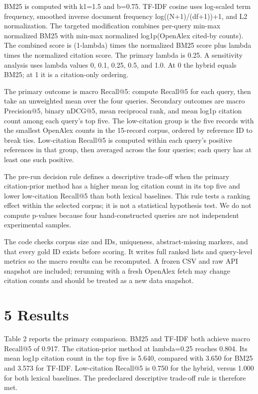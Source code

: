 \documentclass[acmsmall,nonacm]{acmart}
\begin{document}
BM25 is computed with k1=1.5 and b=0.75. TF-IDF cosine uses log-scaled term frequency, smoothed inverse document frequency log((N+1)/(df+1))+1, and L2 normalization. The targeted modification combines per-query min-max normalized BM25 with min-max normalized log1p(OpenAlex cited-by counts). The combined score is (1-lambda) times the normalized BM25 score plus lambda times the normalized citation score. The primary lambda is 0.25. A sensitivity analysis uses lambda values 0, 0.1, 0.25, 0.5, and 1.0. At 0 the hybrid equals BM25; at 1 it is a citation-only ordering.\par

The primary outcome is macro Recall@5: compute Recall@5 for each query, then take an unweighted mean over the four queries. Secondary outcomes are macro Precision@5, binary nDCG@5, mean reciprocal rank, and mean log1p citation count among each query's top five. The low-citation group is the five records with the smallest OpenAlex counts in the 15-record corpus, ordered by reference ID to break ties. Low-citation Recall@5 is computed within each query's positive references in that group, then averaged across the four queries; each query has at least one such positive.\par

The pre-run decision rule defines a descriptive trade-off when the primary citation-prior method has a higher mean log citation count in its top five and lower low-citation Recall@5 than both lexical baselines. This rule tests a ranking effect within the selected corpus; it is not a statistical hypothesis test. We do not compute p-values because four hand-constructed queries are not independent experimental samples.\par

The code checks corpus size and IDs, uniqueness, abstract-missing markers, and that every gold ID exists before scoring. It writes full ranked lists and query-level metrics so the macro results can be recomputed. A frozen CSV and raw API snapshot are included; rerunning with a fresh OpenAlex fetch may change citation counts and should be treated as a new data snapshot.\par

\section*{5 Results}

Table 2 reports the primary comparison. BM25 and TF-IDF both achieve macro Recall@5 of 0.917. The citation-prior method at lambda=0.25 reaches 0.804. Its mean log1p citation count in the top five is 5.640, compared with 3.650 for BM25 and 3.573 for TF-IDF. Low-citation Recall@5 is 0.750 for the hybrid, versus 1.000 for both lexical baselines. The predeclared descriptive trade-off rule is therefore met.\par
\end{document}
